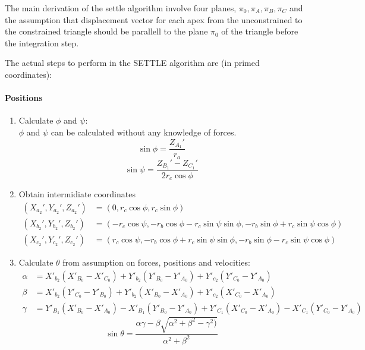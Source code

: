 The main derivation of the settle algorithm involve four planes, $\pi_0, \pi_A, \pi_B, \pi_C$ and the assumption that displacement vector for each apex from the unconstrained to the constrained triangle should be parallell to the plane $\pi_0$ of the triangle before the integration step. 

The actual steps to perform in the SETTLE algorithm are (in primed coordinates):
\paragraph{Positions}
\begin{enumerate}
\item Calculate $\phi$ and $\psi$: \\
$\phi$ and $\psi$ can be calculated without any knowledge of forces.
\begin{equation}
\sin\phi = \frac{Z_{A_1}'}{r_a}
\end{equation}
\begin{equation}
\sin\psi = \frac{Z_{B_1}' - Z_{C_1}'}{2r_c\cos\phi}
\end{equation}

\item Obtain intermidiate coordinates
\begin{align}
(X_{a_2}', Y_{a_2}',Z_{a_2}') &= (0, r_c\cos\phi, r_c\sin\phi)\\
(X_{b_2}', Y_{b_2}',Z_{b_2}') &= (-r_c\cos\psi, -r_b\cos\phi - r_c\sin\psi\sin\phi, -r_b\sin\phi + r_c\sin\psi\cos\phi)\\
(X_{c_2}', Y_{c_2}',Z_{c_2}') &= (r_c\cos\psi, -r_b\cos\phi + r_c\sin\psi\sin\phi, -r_b\sin\phi - r_c\sin\psi\cos\phi)
\end{align}

\item Calculate $\theta$ from assumption on forces, positions and velocities: \\
\begin{align}
	\alpha &= X'_{b_2} ( X'_{B_0}  -X'_{C_0})  +
	Y'_{b_2}( Y'_{B_0}  -Y'_{A_0}) 	+
		Y'_{c_2}( Y'_{C_0}  -Y'_{A_0}) \\
	\beta &= X'_{b_2} ( Y'_{C_0}  -Y'_{B_0})
		 		+Y'_{b_2}( X'_{B_0}  -X'_{A_0}) 	+
		 		Y'_{c_2}( X'_{C_0}  -X'_{A_0}) \\
	\gamma &= Y'_{B_1} ( X'_{B_0}  -X'_{A_0})
			-X'_{B_1}( Y'_{B_0}  -Y'_{A_0}) 	+
			Y'_{C_1}( X'_{C_0}  -X'_{A_0}) 	-
			X'_{C_1}( Y'_{C_0} - Y'_{A_0})
\end{align}
\begin{equation}
\sin \theta = \frac{\alpha\gamma - \beta \sqrt{\alpha^2 + \beta^2 - \gamma^2 )}}{\alpha^2 + \beta^2}
\end{equation}


\end{enumerate}
